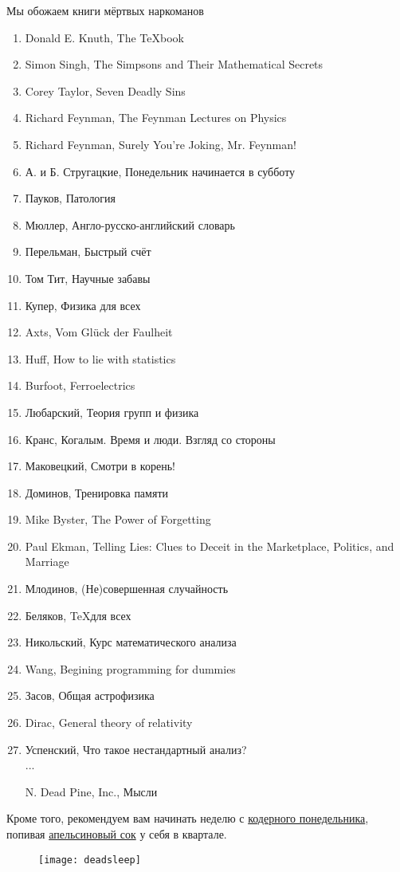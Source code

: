\subtitle{Наш список книг для необязательного прочтения} %
\begin{epigraph}
    Мы обожаем книги мёртвых наркоманов
\end{epigraph}

\vspace{-1em}\begin{enumerate}
    \item Donald E. Knuth, The {\TeX}book
    \item Simon Singh, The Simpsons and Their Mathematical Secrets
    \item Corey Taylor, Seven Deadly Sins
    \item Richard Feynman, The Feynman Lectures on Physics
    \item Richard Feynman, Surely You're Joking, Mr. Feynman!
    \item А. и Б. Стругацкие, Понедельник начинается в субботу
    \item Пауков, Патология
    \item Мюллер, Англо-русско-английский словарь
    \item Перельман, Быстрый счёт
    \item Том Тит, Научные забавы
    \item Купер, Физика для всех
    \item Axts,  Vom Gl\"uck der Faulheit
    \item Huff, How to lie with statistics
    \item Burfoot, Ferroelectrics
    \item Любарский, Теория групп и физика
    \item Кранс, Когалым. Время и люди. Взгляд со стороны
    \item Маковецкий, Смотри в корень!
    \item Доминов, Тренировка памяти
    \item Mike Byster, The Power of Forgetting
    \item Paul Ekman, Telling Lies: Clues to Deceit in the Marketplace, Politics, and Marriage
    \item Млодинов, (Не)совершенная случайность
    \item Беляков, \TeX для всех
    \item Никольский, Курс математического анализа
    \item Wang, Begining programming for dummies
    \item Засов, Общая астрофизика
    \item Dirac, General theory of relativity
    \item Успенский, Что такое нестандартный анализ?\\
    ...
    \item[N.] Dead Pine, Inc., Мысли
\end{enumerate}

Кроме того, рекомендуем вам начинать неделю с
\href{https://freecx.github.io/}{кодерного понедельника},
попивая \href{https://citrux.github.io/blog/}{апельсиновый сок} у себя в квартале.

\begin{figure}[ht!]
    \centering
    \texttt{[image: deadsleep]}
\end{figure}
